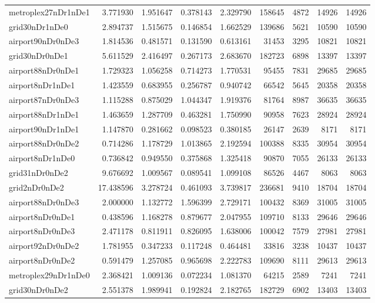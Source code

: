 \begin{longtable}{|l|r|r|r|r|r|r|r|r|}
metroplex27nDr1nDe1 & 3.771930 & 1.951647 & 0.378143 & 2.329790 & 158645 & 4872 & 14926 & 14926 \\
grid30nDr1nDe0 & 2.894737 & 1.515675 & 0.146854 & 1.662529 & 139686 & 5621 & 10590 & 10590 \\
airport90nDr0nDe3 & 1.814536 & 0.481571 & 0.131590 & 0.613161 & 31453 & 3295 & 10821 & 10821 \\
grid30nDr0nDe1 & 5.611529 & 2.416497 & 0.267173 & 2.683670 & 182723 & 6898 & 13397 & 13397 \\
airport88nDr0nDe1 & 1.729323 & 1.056258 & 0.714273 & 1.770531 & 95455 & 7831 & 29685 & 29685 \\
airport8nDr1nDe1 & 1.423559 & 0.683955 & 0.256787 & 0.940742 & 66542 & 5645 & 20358 & 20358 \\
airport87nDr0nDe3 & 1.115288 & 0.875029 & 1.044347 & 1.919376 & 81764 & 8987 & 36635 & 36635 \\
airport88nDr1nDe1 & 1.463659 & 1.287709 & 0.463281 & 1.750990 & 90958 & 7623 & 28924 & 28924 \\
airport90nDr1nDe1 & 1.147870 & 0.281662 & 0.098523 & 0.380185 & 26147 & 2639 & 8171 & 8171 \\
airport88nDr0nDe2 & 0.714286 & 1.178729 & 1.013865 & 2.192594 & 100388 & 8335 & 30954 & 30954 \\
airport8nDr1nDe0 & 0.736842 & 0.949550 & 0.375868 & 1.325418 & 90870 & 7055 & 26133 & 26133 \\
grid31nDr0nDe2 & 9.676692 & 1.009567 & 0.089541 & 1.099108 & 86526 & 4467 & 8063 & 8063 \\
grid2nDr0nDe2 & 17.438596 & 3.278724 & 0.461093 & 3.739817 & 236681 & 9410 & 18704 & 18704 \\
airport88nDr0nDe3 & 2.000000 & 1.132772 & 1.596399 & 2.729171 & 100432 & 8369 & 31005 & 31005 \\
airport8nDr0nDe1 & 0.438596 & 1.168278 & 0.879677 & 2.047955 & 109710 & 8133 & 29646 & 29646 \\
airport8nDr0nDe3 & 2.471178 & 0.811911 & 0.826095 & 1.638006 & 100042 & 7579 & 27981 & 27981 \\
airport92nDr0nDe2 & 1.781955 & 0.347233 & 0.117248 & 0.464481 & 33816 & 3238 & 10437 & 10437 \\
airport8nDr0nDe2 & 0.591479 & 1.257085 & 0.965698 & 2.222783 & 109690 & 8111 & 29613 & 29613 \\
metroplex29nDr1nDe0 & 2.368421 & 1.009136 & 0.072234 & 1.081370 & 64215 & 2589 & 7241 & 7241 \\
grid30nDr0nDe2 & 2.551378 & 1.989941 & 0.192824 & 2.182765 & 182729 & 6902 & 13403 & 13403 \\

\end{longtable}

